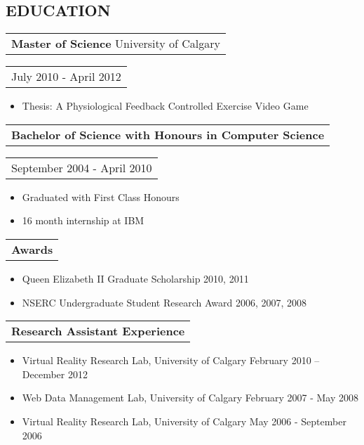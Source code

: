 \documentclass{resume}
\begin{document}
\begin{resume}
\section{EDUCATION}
    \vspace{+0.1in}
    \begin{tabular}[t]{@{}l}
        {\bf Master of Science} University of Calgary
    \end{tabular}\vspace{+0.05in}
    \hfill
    \begin{tabular}[t]{l@{}}
        July 2010 - April 2012
    \end{tabular}
    \begin{itemize} \itemsep -2pt
    \item Thesis: A Physiological Feedback Controlled Exercise Video Game
    \end{itemize}

    \begin{tabular}[t]{@{}l}
        {\bf Bachelor of Science with Honours in Computer Science}
    \end{tabular}\vspace{+0.05in}
    \hfill
    \begin{tabular}[t]{l@{}}
        September 2004 - April 2010
    \end{tabular}
    \begin{itemize} \itemsep -2pt
    \item Graduated with First Class Honours
    \item 16 month internship at IBM
    \end{itemize}

    \begin{tabular}[t]{@{}l}
       {\bf Awards  }
    \end{tabular}\vspace{+0.05in}
    \begin{itemize} \itemsep -2pt
    \item Queen Elizabeth II Graduate Scholarship  	2010, 2011
    \item NSERC Undergraduate Student Research Award	2006, 2007, 2008
    \end{itemize}

    \begin{tabular}[t]{@{}l}
        {\bf Research Assistant Experience  }
    \end{tabular}\vspace{+0.05in}
    \begin{itemize} \itemsep -2pt
    \item Virtual Reality Research Lab, University of Calgary	February 2010 – December 2012
    \item Web Data Management Lab, University of Calgary	February 2007 - May 2008
    \item Virtual Reality Research Lab, University of Calgary	 May 2006 - September 2006
    \end{itemize}




\end{resume}
\end{document}
